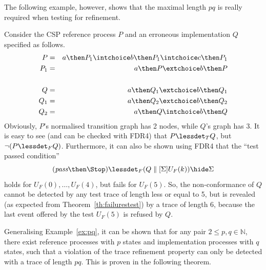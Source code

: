 The following example, however, shows that the maximal length $pq$ is really
required when testing for refinement.
\begin{example}\label{ex:pq}
Consider the CSP reference process $P$ and an erroneous implementation $Q$
specified as follows.
\begin{eqnarray*}
P & = & a \then P_1 \intchoice b \then P_1 \intchoice c \then P_1
\\
P_1 & = & a \then P \extchoice b\then P
\\ & &  \\
Q & = & a\then Q_1 \extchoice b\then Q_1
\\
Q_1 & = & a\then Q_2 \extchoice b\then Q_2
\\
Q_2 & = & a\then Q \intchoice b\then Q
\end{eqnarray*}
Obviously, $P$'s normalised transition graph has 2 nodes, while $Q$'s graph
has 3. It is easy to see (and can be checked with FDR4) that $P\lessdet_T Q$,
but $\neg(P\lessdet_F Q)$. Furthermore, it can also be shown using FDR4 that
the ``test passed condition''
\[
(\epass\then\Stop) \lessdet_F (Q\parallel[\Sigma] U_F(k))\hide \Sigma
\]
holds for $U_F(0),\dots,U_F(4)$, but fails for $U_F(5)$. So, the
non-conformance of $Q$ cannot be detected by any test trace of length less or
equal to 5, but is revealed (as expected from Theorem~\ref{th:failurestest})
by a trace of length 6, because the last event offered by the test $U_F(5)$
is refused by $Q$. \xbox
\end{example}
%
Generalising Example~\ref{ex:pq}, it can be shown that for any pair
$2\le p,q \in\mathbb{N}$,
there exist reference processes with $p$ states
and implementation processes with $q$ states, such that
a violation of the trace refinement property
can only be detected with a trace of length $pq$. This is proven in the following
theorem.

